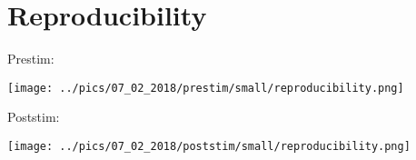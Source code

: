 \documentclass{article}
\begin{document}



\section{Reproducibility}

Prestim:

\texttt{[image: ../pics/07\_02\_2018/prestim/small/reproducibility.png]}

Poststim:

\texttt{[image: ../pics/07\_02\_2018/poststim/small/reproducibility.png]}



\end{document}
